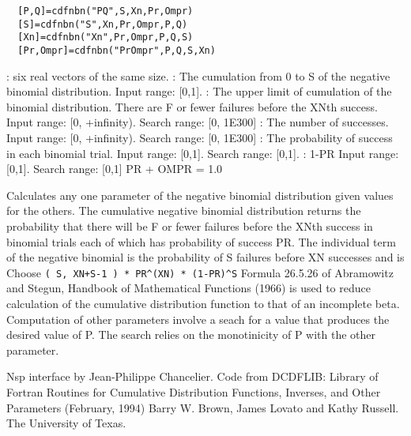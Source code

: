 \begin{mandesc}
\end{mandesc}
\label{cdfnbn}
\begin{calling_sequence}
\begin{verbatim}
  [P,Q]=cdfnbn("PQ",S,Xn,Pr,Ompr)  
  [S]=cdfnbn("S",Xn,Pr,Ompr,P,Q)  
  [Xn]=cdfnbn("Xn",Pr,Ompr,P,Q,S)  
  [Pr,Ompr]=cdfnbn("PrOmpr",P,Q,S,Xn)  
\end{verbatim}
\end{calling_sequence}
\begin{parameters}
  \begin{varlist}
     : six real vectors of the same size.
     : The cumulation from 0 to S of the  negative binomial distribution. Input range: [0,1].
     : The upper limit of cumulation of the binomial distribution. There are F or fewer failures before the XNth success. Input range: [0, +infinity). Search range: [0, 1E300]
       :   The number of successes. Input range: [0, +infinity). Search range: [0, 1E300]
         :   The probability of success in each binomial trial. Input range: [0,1]. Search range: [0,1].
         :   1-PR Input range: [0,1]. Search range: [0,1] PR + OMPR = 1.0
  \end{varlist}
\end{parameters}
\begin{mandescription}
  Calculates any one parameter of the negative binomial
  distribution given values for the others.
  The  cumulative  negative   binomial  distribution  returns  the
  probability that there  will be  F or fewer failures before  the
  XNth success in binomial trials each of which has probability of
  success PR.
  The individual term of the negative binomial is the probability of
  S failures before XN successes and is
  Choose \verb!( S, XN+S-1 ) * PR^(XN) * (1-PR)^S!
  Formula   26.5.26   of   Abramowitz  and  Stegun,  Handbook   of
  Mathematical Functions (1966) is used  to  reduce calculation of
  the cumulative distribution  function to that of  an  incomplete
  beta.
  Computation of other parameters involve a seach for a value that
  produces  the desired  value  of P.   The search relies  on  the
  monotinicity of P with the other parameter.
\end{mandescription}

\begin{authors}
  Nsp interface by Jean-Philippe Chancelier. Code from DCDFLIB: 
  Library of Fortran Routines for Cumulative Distribution
  Functions, Inverses, and Other Parameters (February, 1994)
  Barry W. Brown, James Lovato and Kathy Russell. The University of Texas.
\end{authors}
